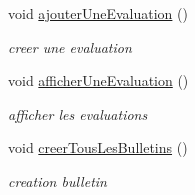 \begin{DoxyCompactItemize}
void \hyperlink{class_section_a5947f98d44574643e111cc83c18a55c4}{ajouter\+Une\+Evaluation} ()
\begin{DoxyCompactList}\small\item\em creer une evaluation \end{DoxyCompactList}\item 
void \hyperlink{class_section_a7fa8e1804fc1643184330429cebc45af}{afficher\+Une\+Evaluation} ()
\begin{DoxyCompactList}\small\item\em afficher les evaluations \end{DoxyCompactList}\item 
void \hyperlink{class_section_abfb639b9563b4f0b00f9f8cdc6e28e65}{creer\+Tous\+Les\+Bulletins} ()
\begin{DoxyCompactList}\small\item\em creation bulletin \end{DoxyCompactList}\end{DoxyCompactItemize}
